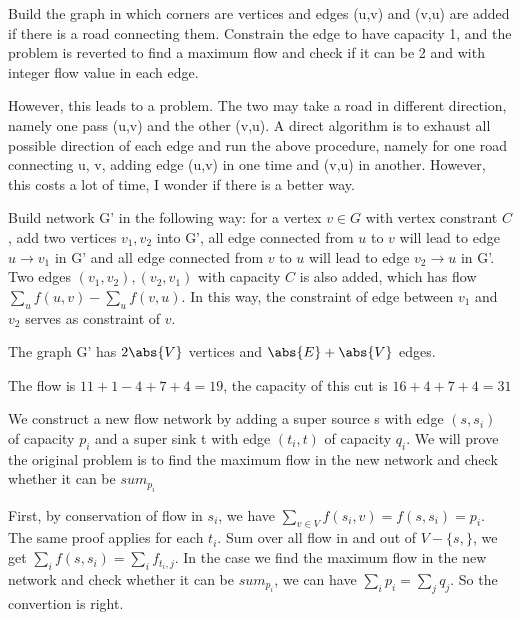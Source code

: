 \begin{psproblem}[26.1.6]
\end{psproblem}
\begin{pssolution}
    Build the graph in which corners are vertices and edges (u,v) and (v,u) are added if there is a road connecting them. Constrain the edge to have capacity 1, and the problem is reverted to find a maximum flow and check if it can be 2 and with integer flow value in each edge.

    However, this leads to a problem. The two may take a road in different direction, namely one pass (u,v) and the other (v,u). A direct algorithm is to exhaust all possible direction of each edge and run the above procedure, namely for one road connecting u, v, adding edge (u,v) in one time and (v,u) in another. However, this costs a lot of time, I wonder if there is a better way.
\end{pssolution}

\begin{psproblem}[26.1.7]
\end{psproblem}
\begin{pssolution}
    Build network G' in the following way: for a vertex $v\in G$ with vertex constrant $C$, add two vertices $v_1,v_2$ into G', all edge connected from $u$ to $v$ will lead to edge $u\rightarrow v_1$ in G' and all edge connected from $v$ to $u$ will lead to edge $v_2\rightarrow u$ in G'. Two edges $(v_1,v_2),(v_2,v_1)$ with capacity $C$ is also added, which has flow $\sum_{u}f(u,v)-\sum_{u}f(v,u)$. In this way, the constraint of edge between $v_1$ and $v_2$ serves as constraint of $v$.

    The graph G' has $2\abs{V}$ vertices and $\abs{E}+\abs{V}$ edges.
\end{pssolution}

\begin{psproblem}[26.2.2]
\end{psproblem}
\begin{pssolution}
    The flow is $11+1-4+7+4=19$, the capacity of this cut is $16+4+7+4=31$
\end{pssolution}

\begin{psproblem}[26.2.6]
\end{psproblem}
\begin{pssolution}
    We construct a new flow network by adding a super source s with edge $(s,s_i)$ of capacity $p_i$ and a super sink t with edge $(t_i,t)$ of capacity $q_i$. We will prove the original problem is to find the maximum flow in the new network and check whether it can be $sum_{p_i}$

    First, by conservation of flow in $s_i$, we have $\sum_{v\in V}f(s_i,v)=f(s,s_i)=p_i$. The same proof applies for each $t_i$. Sum over all flow in and out of $V-\{s,\}$, we get $\sum_{i}f(s,s_i)=\sum_{i}f_{t_i,j}$. In the case we find the maximum flow in the new network and check whether it can be $sum_{p_i}$, we can have $\sum_ip_i=\sum_jq_j$. So the convertion is right.
\end{pssolution}

